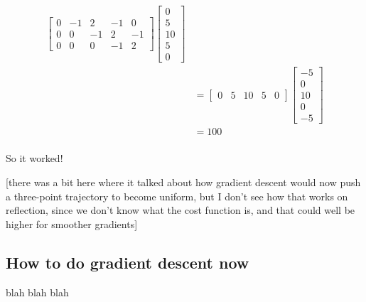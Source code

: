 \documentclass[twoside]{article}
\begin{document}
\begin{align*}
\begin{bmatrix}
                    0 & -1 & 2 & -1 & 0 \\
                    0 & 0 & -1 & 2 & -1 \\
                    0 & 0 & 0 & -1 & 2
                  \end{bmatrix}
                  \begin{bmatrix}
                    0 \\
                    5 \\
                    10 \\
                    5 \\
                    0
                  \end{bmatrix} \\
                &=\begin{bmatrix}
                    0 & 5 & 10 & 5 & 0
                  \end{bmatrix}
                  \begin{bmatrix}
                    -5 \\
                    0 \\
                    10 \\
                    0 \\
                    -5
                  \end{bmatrix} \\
                &= 100 \\
\end{align*}

So it worked!

[there was a bit here where it talked about how gradient descent would now push a three-point trajectory to become uniform, but I don't see how that works on reflection, since we don't know what the cost function is, and that could well be higher for smoother gradients]

\subsection{How to do gradient descent now}
\label{sec:how-do-gradient}

blah blah blah
\end{document}

